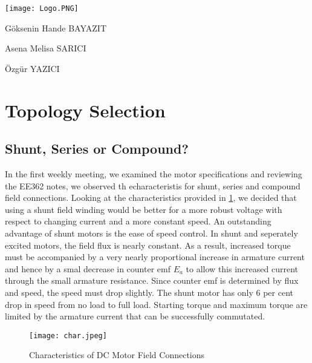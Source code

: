 \documentclass[10pt,a4paper]{article}
\begin{document}
\begin{titlepage}
\centering


\texttt{[image: Logo.PNG]} \par

\LARGE
\vspace{2cm}
{Göksenin Hande BAYAZIT\par Asena Melisa SARICI\par Özgür YAZICI}


\end{titlepage}

\newpage

\section*{Topology Selection}

\subsection*{Shunt, Series or Compound?}
In the first weekly meeting, we examined the motor specifications and reviewing the EE362 notes, we observed th echaracteristis for shunt, series and compound field connections. Looking at the characteristics provided in \ref{fig:1}, we decided that using a shunt field winding would be better for a more robust voltage with respect to changing current and a more constant speed.  An outstanding advantage of shunt motors is the ease of speed control.  In shunt and seperately excited motors, the field flux is nearly constant. As a result, increased torque must be accompanied by a very nearly proportional increase in armature current and hence by a smal decrease in counter emf $E_{a}$ to allow this increased current through the small armature resistance.  Since counter emf is determined by flux and speed, the speed must drop slightly. The shunt motor has only 6 per cent drop in speed from no load to full load. Starting torque and maximum torque are limited by the armature current that can be successfully commutated.



\begin{figure}[!ht]
\centering
\texttt{[image: char.jpeg]} 
\caption{Characteristics of DC Motor Field Connections}
\label{fig:1}
\end{figure}
\end{document}

